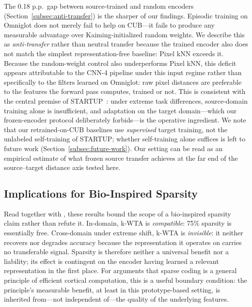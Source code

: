 \documentclass[11pt]{article}
\begin{document}
The 0.18 p.p.\ gap between source-trained and random encoders (Section~\ref{subsec:anti-transfer}) is the sharper of our findings. Episodic training on Omniglot does not merely fail to help on CUB---it fails to produce any measurable advantage over Kaiming-initialized random weights. We describe this as \emph{anti-transfer} rather than neutral transfer because the trained encoder also does not match the simplest representation-free baseline: Pixel kNN exceeds it. Because the random-weight control also underperforms Pixel kNN, this deficit appears attributable to the CNN-4 pipeline under this input regime rather than specifically to the filters learned on Omniglot: raw pixel distances are preferable to the features the forward pass computes, trained or not. This is consistent with the central premise of STARTUP~\citep{phoo2021self}: under extreme task differences, source-domain training alone is insufficient, and adaptation on the target domain---which our frozen-encoder protocol deliberately forbids---is the operative ingredient. We note that our retrained-on-CUB baselines use \emph{supervised} target training, not the unlabeled self-training of STARTUP; whether self-training alone suffices is left to future work (Section~\ref{subsec:future-work}). Our setting can be read as an empirical estimate of what frozen source transfer achieves at the far end of the source--target distance axis tested here.

\subsection{Implications for Bio-Inspired Sparsity}
\label{subsec:implications}

Read together with \citet{pinho2026kwta}, these results bound the scope of a bio-inspired sparsity claim rather than refute it. In-domain, k-WTA is \emph{compatible}: 75\% sparsity is essentially free. Cross-domain under extreme shift, k-WTA is \emph{invisible}: it neither recovers nor degrades accuracy because the representation it operates on carries no transferable signal. Sparsity is therefore neither a universal benefit nor a liability; its effect is contingent on the encoder having learned a relevant representation in the first place. For arguments that sparse coding is a general principle of efficient cortical computation, this is a useful boundary condition: the principle's measurable benefit, at least in this prototype-based setting, is inherited from---not independent of---the quality of the underlying features.
\end{document}
